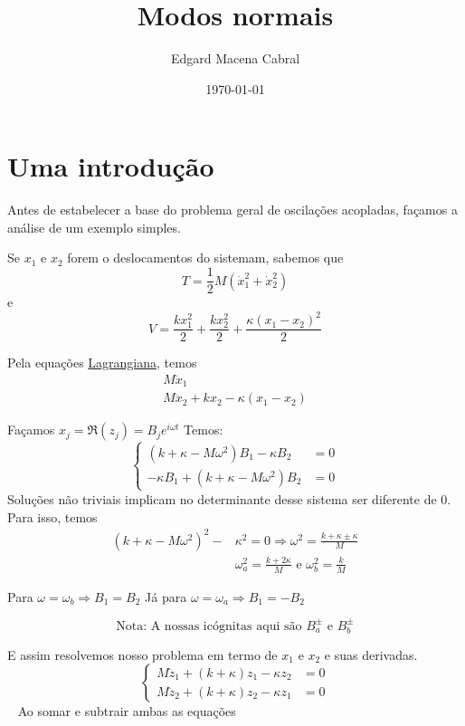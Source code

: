 \documentclass[11pt]{article}
\author{Edgard Macena Cabral}
\date{\today}
\title{Modos normais}
\begin{document}
\maketitle
\tableofcontents



\section{Uma introdução}
\label{sec:org9d342e2}

Antes de estabelecer a base do problema geral de oscilações acopladas,
façamos a análise de um exemplo simples.

Se \(x_{1}\) e \(x_{2}\) forem o deslocamentos do sistemam, sabemos que
\[
T  = \frac{1}{2}M(\dot{x}_{1}^{2} + \dot{x}_{2}^{2})
\]
e
\[
V = \frac{kx_{1}^{2}}{2} + \frac{kx_{2}^{2}}{2} + \frac{\kappa (x_{1} - x_{2})^2}{2} 
\]

Pela equações \href{20211123091021-lagrangiana.org}{Lagrangiana}, temos
\begin{align}
  M\ddot{x}_{1} \\
  M\ddot{x}_{2} + kx_{2} -\kappa (x_{1} - x_{2}) 
\end{align}

Façamos \(x_{j} = \Re(z_{j}) = B_{j}e^{i \omega t}\)
Temos:
\[\begin{cases}
(k + \kappa - M \omega^{2})B_{1} - \kappa B_{2} &= 0\\
-\kappa B_{1} + (k + \kappa - M \omega^{2})B_{2} &= 0
\end{cases}\]
Soluções não triviais implicam no determinante desse sistema ser diferente
de 0. Para isso, temos
\begin{align}
  (k + \kappa - M\omega^{2})^{2} -&\kappa^{2} = 0 \Rightarrow \omega^{2} = \frac{k + \kappa \pm \kappa }{M}\\
  &\omega_{a}^{2} = \frac{k + 2\kappa}{M} \mbox{ e } \omega_{b}^{2} = \frac{k}{M}
\end{align}

Para \(\omega = \omega_b \Rightarrow B_{1} = B_{2}\)
Já para \(\omega = \omega_a \Rightarrow B_1 = -B_2\)

$$\boxed{ \mbox{Nota: A nossas icógnitas aqui são } B_{a}^{\pm} \mbox{ e } B_{b}^{\pm} }$$

E assim resolvemos nosso problema em termo de \(x_{1} \mbox{ e } x_{2}\) e suas
derivadas.
 
\[\begin{cases}
  M\ddot{z}_{1} + (k + \kappa)z_{1} - \kappa z_{2} &= 0\\
  M\ddot{z}_{2} + (k + \kappa)z_{2} - \kappa z_{1} &= 0
\end{cases}\]
 
Ao somar e subtrair ambas as equações
\end{document}
